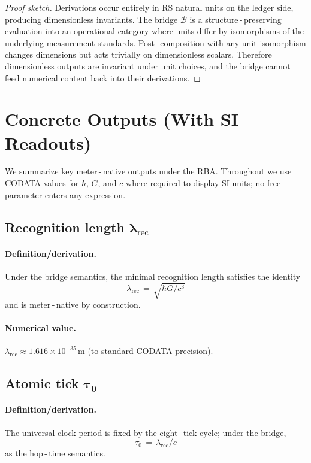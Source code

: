 \documentclass[11pt]{article}
\newcommand{\lamrec}{\lambda_{\mathrm{rec}}}
\newcommand{\tauzero}{\tau_{0}}
\theoremstyle{remark}
\begin{document}
\begin{proof}[Proof sketch]
Derivations occur entirely in RS natural units on the ledger side, producing dimensionless invariants. The bridge $\mathcal B$ is a structure\,\mbox{-}\,preserving evaluation into an operational category where units differ by isomorphisms of the underlying measurement standards. Post\,\mbox{-}\,composition with any unit isomorphism changes dimensions but acts trivially on dimensionless scalars. Therefore dimensionless outputs are invariant under unit choices, and the bridge cannot feed numerical content back into their derivations.
\end{proof}

\section{Concrete Outputs (With SI Readouts)}
We summarize key meter\,\mbox{-}\,native outputs under the RBA. Throughout we use CODATA values for $\hbar$, $G$, and $c$ where required to display SI units; no free parameter enters any expression.

\subsection*{Recognition length $\boldsymbol{\lamrec}$}
\paragraph{Definition/derivation.}
Under the bridge semantics, the minimal recognition length satisfies the identity
\[
  \boxed{\;\lamrec \,=\, \sqrt{\hbar G/ c^{3}}\;}
\]
and is meter\,\mbox{-}\,native by construction.
\paragraph{Numerical value.}
\(\lamrec \approx 1.616\times 10^{-35}\,\mathrm{m}\) (to standard CODATA precision).

\subsection*{Atomic tick $\boldsymbol{\tauzero}$}
\paragraph{Definition/derivation.}
The universal clock period is fixed by the eight\,\mbox{-}\,tick cycle; under the bridge,
\[
  \boxed{\;\tauzero \,=\, \lamrec/ c\;}
\]
as the hop\,\mbox{-}\,time semantics.
\end{document}
